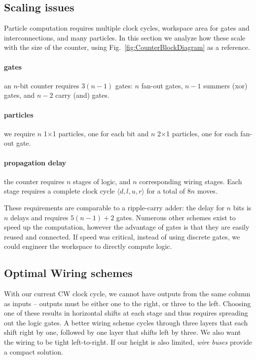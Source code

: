 \documentclass[letterpaper, 10 pt, conference]{ieeeconf}
\begin{document}
\subsection{Scaling issues}
 Particle computation requires multiple clock cycles, workspace area for gates and interconnections, and many particles.  In this section we analyze how these scale with the size of the counter, using Fig.~\ref{fig:CounterBlockDiagram} as a reference.   


\paragraph{gates}  an $n$-bit counter requires $3(n-1)$ gates: $n$ {\sc fan-out} gates, $n-1$ summers ({\sc xor}) gates, and $n-2$ carry ({\sc and}) gates. 
\paragraph{particles} we require $n$ 1$\times$1 particles, one for each bit and $n$ 2$\times$1 particles, one for each {\sc fan-out} gate.
\paragraph{ propagation delay} the counter requires $n$ stages of logic, and $n$ corresponding wiring stages.  Each stage requires a complete clock cycle $\langle d,l,u,r \rangle$ for a total of 8$n$ moves.

These requirements are comparable to a ripple-carry adder:  the delay for $n$ bits is $n$ delays  and requires $5(n-1)+2$ gates.
Numerous other schemes exist to speed up the computation, however the advantage of gates is that they are easily reused and connected.  If speed was critical, instead of using discrete gates, we could engineer the workspace to directly compute logic.  

\subsection{Optimal Wiring schemes}\label{sec:wiring}
With our current CW clock cycle, we cannot have outputs from the same column as
inputs -- outputs must be either one to the right, or three to the left.
Choosing one of these results in horizontal shifts at each stage and thus
requires spreading out the logic gates. A better wiring scheme cycles
through three layers that each shift right by one, followed by one layer that
shifts left by three.  We also want the wiring to be tight left-to-right.  If our
height is also limited, \emph{wire buses} provide a compact solution. 
\end{document}
